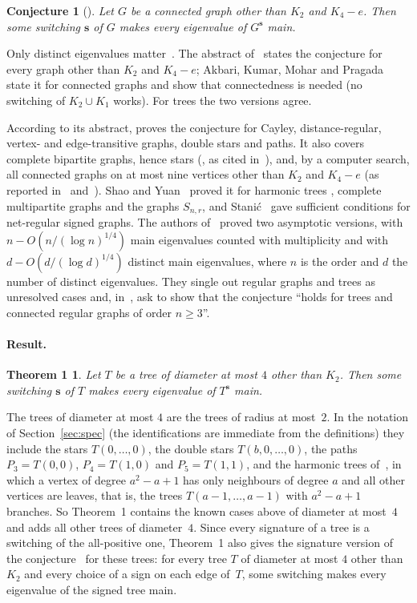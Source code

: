 \documentclass[11pt]{article}
\numberwithin{equation}{section}
\newtheorem*{thmone}{Theorem 1}
\newtheorem*{conj}{Conjecture}
\theoremstyle{remark}
\newcommand{\s}{\mathbf s}
\begin{document}
\begin{conj}[{\cite{afgjl}}]
Let $G$ be a connected graph other than $K_2$ and $K_4-e$. Then some switching
$\s$ of $G$ makes every eigenvalue of $G^{\s}$ main.
\end{conj}

Only distinct eigenvalues matter~\cite[Proposition~1.3]{akmp}. The abstract
of~\cite{afgjl} states the conjecture for every graph other than $K_2$ and
$K_4-e$; Akbari, Kumar, Mohar and Pragada~\cite{akmp} state it for connected
graphs and show that connectedness is needed (no switching of $K_2\cup K_1$
works). For trees the two
versions agree.

According to its abstract, \cite{afgjl} proves the conjecture for Cayley,
distance-regular, vertex- and edge-transitive graphs, double stars and paths.
It also covers complete bipartite graphs, hence stars
(\cite[Theorem~4.1]{afgjl}, as cited in~\cite[Section~4]{sy}), and, by a
computer search, all connected graphs on at most nine vertices other than
$K_2$ and $K_4-e$ (as reported in~\cite[Section~1.2]{akmp}
and~\cite[Section~5]{sy}). Shao and
Yuan~\cite{sy} proved it for harmonic trees \cite[Proposition~2.1]{sy},
complete multipartite graphs and the graphs $S_{n,r}$, and
Stani\'c~\cite{sta} gave sufficient conditions for net-regular signed graphs.
The authors of~\cite{akmp} proved two asymptotic versions, with
$n-O(n/(\log n)^{1/4})$ main eigenvalues counted with multiplicity and with
$d-O(d/(\log d)^{1/4})$ distinct main eigenvalues, where $n$ is the order and
$d$ the number of distinct eigenvalues. They single out regular graphs and
trees as unresolved cases and, in~\cite[Problem~1.6]{akmp}, ask to show that
the conjecture ``holds for trees and connected regular graphs of order
$n\ge 3$''.

\paragraph{Result.}
\begin{thmone}
Let $T$ be a tree of diameter at most $4$ other than $K_2$. Then some switching
$\s$ of $T$ makes every eigenvalue of $T^{\s}$ main.
\end{thmone}

The trees of diameter at most $4$ are the trees of radius at most~$2$. In the
notation of Section~\ref{sec:spec} (the identifications are immediate from the
definitions) they include the stars $T(0,\dots,0)$, the
double stars $T(b,0,\dots,0)$, the paths $P_3=T(0,0)$, $P_4=T(1,0)$ and
$P_5=T(1,1)$, and the harmonic trees of~\cite{sy}, in which a vertex of degree
$a^2-a+1$ has only neighbours of degree $a$ and all other vertices are leaves,
that is, the trees $T(a-1,\dots,a-1)$ with $a^2-a+1$ branches. So Theorem~1
contains the known cases above of diameter at most~$4$ and adds all other trees
of diameter~$4$. Since every signature of a tree is a switching of the
all-positive one, Theorem~1 also gives the signature version of the
conjecture~\cite[Conjecture~1.7]{akmp} for these trees: for every tree $T$ of
diameter at most $4$ other than $K_2$ and every choice of a sign on each edge
of~$T$, some switching makes every eigenvalue of the signed tree main.
\end{document}
